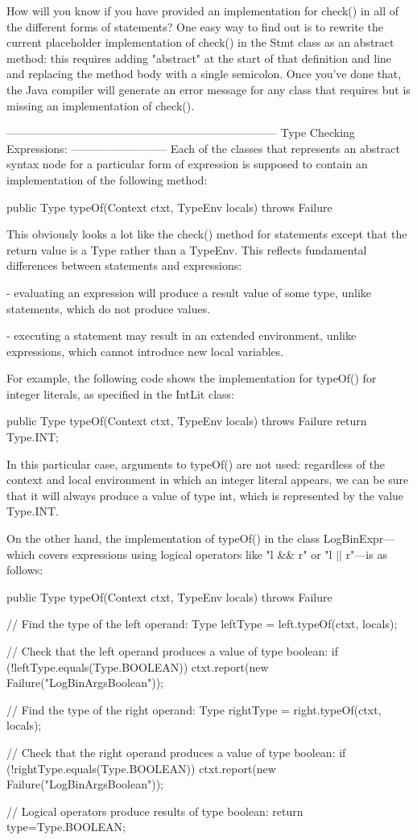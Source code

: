 \documentclass{article}
\begin{document}
How will you know if you have provided an implementation for check()
in all of the different forms of statements?  One easy way to find out
is to rewrite the current placeholder implementation of check() in the
Stmt class as an abstract method: this requires adding "abstract" at
the start of that definition and line and replacing the method body
with a single semicolon.  Once you've done that, the Java compiler
will generate an error message for any class that requires but is
missing an implementation of check().

------------------------------------------------------------------------
Type Checking Expressions:
--------------------------
Each of the classes that represents an abstract syntax node for a
particular form of expression is supposed to contain an implementation
of the following method:

    public Type typeOf(Context ctxt, TypeEnv locals)
      throws Failure

This obviously looks a lot like the check() method for statements
except that the return value is a Type rather than a TypeEnv.  This
reflects fundamental differences between statements and expressions:

- evaluating an expression will produce a result value of some type,
  unlike statements, which do not produce values.

- executing a statement may result in an extended environment, unlike
  expressions, which cannot introduce new local variables.

For example, the following code shows the implementation for typeOf()
for integer literals, as specified in the IntLit class:

    public Type typeOf(Context ctxt, TypeEnv locals)
      throws Failure {
        return Type.INT;
    }

In this particular case, arguments to typeOf() are not used:
regardless of the context and local environment in which an integer
literal appears, we can be sure that it will always produce a value
of type int, which is represented by the value Type.INT.

On the other hand, the implementation of typeOf() in the class
LogBinExpr---which covers expressions using logical operators like
"l \&\& r" or "l $|$$|$ r"---is as follows:

    public Type typeOf(Context ctxt, TypeEnv locals)
      throws Failure {
        // Find the type of the left operand:
        Type leftType = left.typeOf(ctxt, locals);
  
        // Check that the left operand produces a value of type boolean:
        if (!leftType.equals(Type.BOOLEAN)) {
            ctxt.report(new Failure("LogBinArgsBoolean"));
        }
  
        // Find the type of the right operand:
        Type rightType = right.typeOf(ctxt, locals);
  
        // Check that the right operand produces a value of type boolean:
        if (!rightType.equals(Type.BOOLEAN)) {
            ctxt.report(new Failure("LogBinArgsBoolean"));
        }
  
        // Logical operators produce results of type boolean:
        return type=Type.BOOLEAN;
    }
\end{document}
